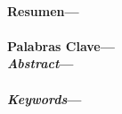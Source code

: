 \newpage
\setcounter{page}{2}
\
\vfill
\vfill
\begin{flushright}
\end{flushright}
\begin{flushright}
\noindent \dedicatoria
\end{flushright}
\vfill
\newpage
\begin{center}
\end{center}
\noindent \agradecimientos
\vfill
\newpage
{}
\vspace{0.3cm}
\noindent \textbf{Resumen---}\resumen \ \\
\vspace{0.3cm} \\
\noindent \textbf{Palabras Clave---}\palabrasclave \ \\
\newpage
{}
\vspace{0.3cm}
\noindent \textbf{\emph{Abstract}---}\resumeningles \ \\
\vspace{0.3cm} \\
\noindent \textbf{\emph{Keywords}---}\palabrasclaveingles \ \\

